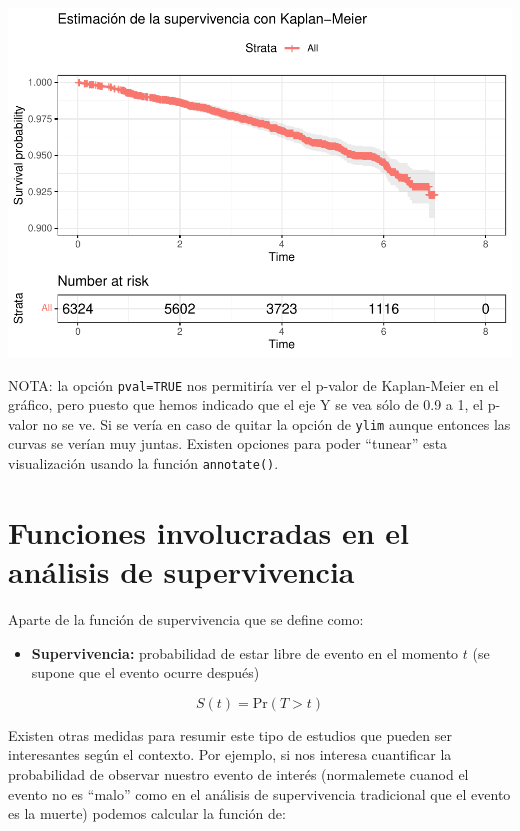 \documentclass[
]{book}
\providecommand{\tightlist}{%
  \setlength{\itemsep}{0pt}\setlength{\parskip}{0pt}}
\begin{document}
\includegraphics{fig_out/plotkm2-1.pdf}

NOTA: la opción \texttt{pval=TRUE} nos permitiría ver el p-valor de Kaplan-Meier en el gráfico, pero puesto que hemos indicado que el eje Y se vea sólo de 0.9 a 1, el p-valor no se ve. Si se vería en caso de quitar la opción de \texttt{ylim} aunque entonces las curvas se verían muy juntas. Existen opciones para poder ``tunear'' esta visualización usando la función \texttt{annotate()}.

\hypertarget{funciones-involucradas-en-el-anuxe1lisis-de-supervivencia}{%
\section{Funciones involucradas en el análisis de supervivencia}\label{funciones-involucradas-en-el-anuxe1lisis-de-supervivencia}}

Aparte de la función de supervivencia que se define como:

\begin{itemize}
\tightlist
\item
  \textbf{Supervivencia:} probabilidad de estar libre de evento en el momento \(t\) (se supone que el evento ocurre después)
\end{itemize}

\[S(t) = \text{Pr}(T>t)\]

Existen otras medidas para resumir este tipo de estudios que pueden ser interesantes según el contexto. Por ejemplo, si nos interesa cuantificar la probabilidad de observar nuestro evento de interés (normalemete cuanod el evento no es ``malo'' como en el análisis de supervivencia tradicional que el evento es la muerte) podemos calcular la función de:
\end{document}
